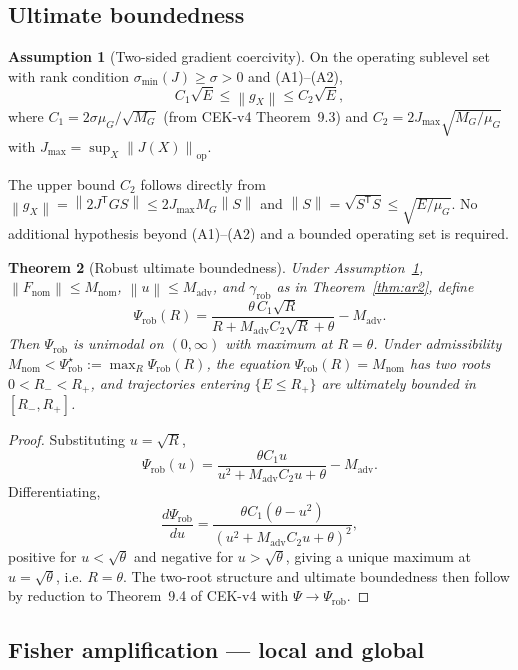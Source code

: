 \documentclass[11pt,a4paper]{article}
\newtheorem{theorem}{Theorem}[section]
\theoremstyle{definition}
\newtheorem{assumption}[theorem]{Assumption}
\newcommand{\T}{^{\mathsf{T}}}
\newcommand{\norm}[1]{\left\|#1\right\|}
\newcommand{\rob}{\mathrm{rob}}
\newcommand{\nom}{\mathrm{nom}}
\newcommand{\adv}{\mathrm{adv}}
\begin{document}
\subsection{Ultimate boundedness}

\begin{assumption}[Two-sided gradient coercivity]
\label{ass:twoside}
On the operating sublevel set with rank condition $\sigma_{\min}(J) \geq \sigma > 0$ and (A1)--(A2),
\[
C_1 \sqrt{E} \leq \norm{g_X} \leq C_2 \sqrt{E},
\]
where $C_1 = 2\sigma\mu_G/\sqrt{M_G}$ (from CEK-v4 Theorem~9.3) and $C_2 = 2 J_{\max} \sqrt{M_G/\mu_G}$ with $J_{\max} = \sup_X \norm{J(X)}_\mathrm{op}$.
\end{assumption}

The upper bound $C_2$ follows directly from $\norm{g_X} = \norm{2 J\T G S} \leq 2 J_{\max} M_G \norm{S}$ and $\norm{S} = \sqrt{S\T S} \leq \sqrt{E/\mu_G}$. No additional hypothesis beyond (A1)--(A2) and a bounded operating set is required.

\begin{theorem}[Robust ultimate boundedness]
\label{thm:ar3}
Under Assumption~\ref{ass:twoside}, $\norm{F_\nom} \leq M_\nom$, $\norm{u} \leq M_\adv$, and $\gamma_\rob$ as in Theorem~\ref{thm:ar2}, define
\[
\Psi_\rob(R) = \frac{\theta\,C_1 \sqrt{R}}{R + M_\adv C_2 \sqrt{R} + \theta} - M_\adv.
\]
Then $\Psi_\rob$ is unimodal on $(0, \infty)$ with maximum at $R = \theta$. Under admissibility $M_\nom < \Psi_\rob^\star := \max_R \Psi_\rob(R)$, the equation $\Psi_\rob(R) = M_\nom$ has two roots $0 < R_- < R_+$, and trajectories entering $\{E \leq R_+\}$ are ultimately bounded in $[R_-, R_+]$.
\end{theorem}

\begin{proof}
Substituting $u = \sqrt{R}$,
\[
\Psi_\rob(u) = \frac{\theta C_1 u}{u^2 + M_\adv C_2 u + \theta} - M_\adv.
\]
Differentiating,
\[
\frac{d\Psi_\rob}{du} = \frac{\theta C_1 (\theta - u^2)}{(u^2 + M_\adv C_2 u + \theta)^2},
\]
positive for $u < \sqrt{\theta}$ and negative for $u > \sqrt{\theta}$, giving a unique maximum at $u = \sqrt{\theta}$, i.e. $R = \theta$. The two-root structure and ultimate boundedness then follow by reduction to Theorem~9.4 of CEK-v4 with $\Psi \to \Psi_\rob$.
\end{proof}

\subsection{Fisher amplification --- local and global}
\end{document}
